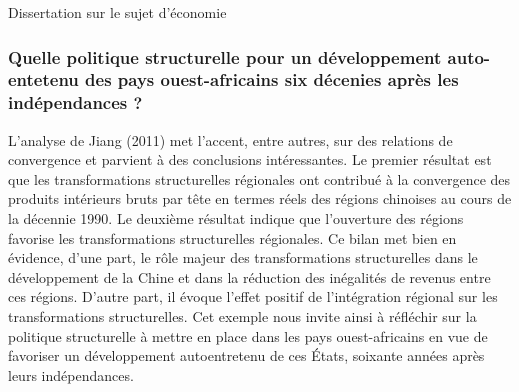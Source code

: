 \newpage \begin{bclogo}[barre=none,logo={}]{Dissertation sur le sujet d'économie}
	\begin{center}
		\subsubsection*{Quelle politique structurelle pour un développement auto-entetenu des pays ouest-africains six décenies après les indépendances ?}
	\end{center}
\end{bclogo}


%

	\hspace*{.5cm}L'analyse de Jiang (2011) met l'accent, entre autres, sur des relations de convergence et parvient à des conclusions intéressantes. Le premier résultat est que les transformations structurelles régionales ont contribué à la convergence des produits intérieurs bruts par tête en termes réels des régions chinoises au cours de la décennie 1990. Le deuxième résultat indique que l'ouverture des régions favorise les transformations structurelles régionales. Ce bilan met bien en évidence, d'une part, le rôle majeur des transformations structurelles dans le développement de la Chine et dans la réduction des inégalités de revenus entre ces régions. D'autre part, il évoque l'effet positif de l'intégration régional sur les transformations structurelles. Cet exemple nous invite ainsi à réfléchir sur la politique structurelle à mettre en place dans les pays ouest-africains en vue de favoriser un développement autoentretenu de ces \'Etats,  soixante années après leurs indépendances. 
	
